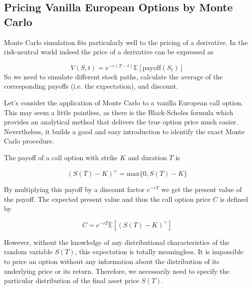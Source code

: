 \subsection{Pricing Vanilla European Options by Monte Carlo}
Monte Carlo simulation fits particularly well to the pricing of a derivative. In the risk-neutral world indeed the price of a derivative can be expressed as

\begin{equation}
V(S, t) = e^{-r(T-t)} \mathbb{E}[\textrm{payoff}(S_t)]
\end{equation}
So we need to simulate different stock paths, calculate the average of the corresponding payoffs (i.e. the expectation), and discount.

%

Let's consider the application of Monte Carlo to a vanilla European call option. This may seem a little pointless, as there is the Black-Scholes formula which provides an analytical method that delivers the true option price much easier. Nevertheless, it builds a good and easy introduction to identify the exact Monte Carlo procedure. 

The payoff of a call option with strike $K$ and duration $T$ is 

\begin{equation}
(S(T)−K)^+ = \textrm{max}\{0,S(T)−K\}
\end{equation}

By multiplying this payoff by a discount factor $e^{−rT}$ we get the present value of the payoff. 
The expected present value and thus the call option price $C$ is defined by

\begin{equation} 
C = e^{−rT} \mathbb{E}[(S(T) −K)^+ ]
\label{eq:call_payoff}
\end{equation}

However, without the knowledge of any distributional characteristics of the random variable $S(T)$, this expectation is totally meaningless. It is impossible to price an option without any information about the distribution of its underlying price or its return. Therefore, we necessarily need to specify the particular distribution of the final asset price $S(T)$. 

